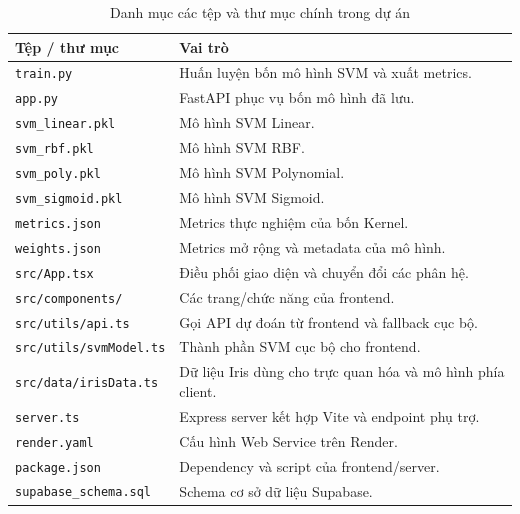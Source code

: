 \documentclass{article}
\begin{document}
	\begin{table}[H]
		\centering
		\caption{Danh mục các tệp và thư mục chính trong dự án}
		\label{tab:project_structure}
		\small %
		\begin{tabular}{p{}p{}}
			\toprule
			\textbf{Tệp / thư mục} & \textbf{Vai trò}\\
			\midrule
			\texttt{train.py} & Huấn luyện bốn mô hình SVM và xuất metrics.\\
			\texttt{app.py} & FastAPI phục vụ bốn mô hình đã lưu.\\
			\texttt{svm\_linear.pkl} & Mô hình SVM Linear.\\
			\texttt{svm\_rbf.pkl} & Mô hình SVM RBF.\\
			\texttt{svm\_poly.pkl} & Mô hình SVM Polynomial.\\
			\texttt{svm\_sigmoid.pkl} & Mô hình SVM Sigmoid.\\
			\texttt{metrics.json} & Metrics thực nghiệm của bốn Kernel.\\
			\texttt{weights.json} & Metrics mở rộng và metadata của mô hình.\\
			\texttt{src/App.tsx} & Điều phối giao diện và chuyển đổi các phân hệ.\\
			\texttt{src/components/} & Các trang/chức năng của frontend.\\
			\texttt{src/utils/api.ts} & Gọi API dự đoán từ frontend và fallback cục bộ.\\
			\texttt{src/utils/svmModel.ts} & Thành phần SVM cục bộ cho frontend.\\
			\texttt{src/data/irisData.ts} & Dữ liệu Iris dùng cho trực quan hóa và mô hình phía client.\\
			\texttt{server.ts} & Express server kết hợp Vite và endpoint phụ trợ.\\
			\texttt{render.yaml} & Cấu hình Web Service trên Render.\\
			\texttt{package.json} & Dependency và script của frontend/server.\\
			\texttt{supabase\_schema.sql} & Schema cơ sở dữ liệu Supabase.\\
			\bottomrule
		\end{tabular}
	\end{table}
	
	
	\newpage
\end{document}
